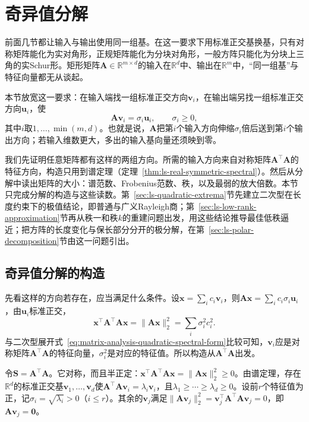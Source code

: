 
\section{奇异值分解}
\label{sec:ls-svd}

前面几节都让输入与输出使用同一组基。在这一要求下用标准正交基换基，只有对称矩阵能化为实对角形，正规矩阵能化为分块对角形，一般方阵只能化为分块上三角的实Schur形。矩形矩阵$\bm A\in\mathbb R^{m\times d}$的输入在$\mathbb R^d$中、输出在$\mathbb R^m$中，“同一组基”与特征向量都无从谈起。

本节放宽这一要求：在输入端找一组标准正交方向$\bm v_i$，在输出端另找一组标准正交方向$\bm u_i$，使
\[
 \bm A\bm v_i=\sigma_i\bm u_i,\qquad\sigma_i\geq0,
\]
其中$i$取$1,\ldots,\min(m,d)$。也就是说，$\bm A$把第$i$个输入方向伸缩$\sigma_i$倍后送到第$i$个输出方向；若输入维数更大，多出的输入基向量还须映到零。

我们先证明任意矩阵都有这样的两组方向。所需的输入方向来自对称矩阵$\bm A^\top\bm A$的特征方向，构造只用到谱定理（定理~\ref{thm:ls-real-symmetric-spectral}）。然后从分解中读出矩阵的大小：谱范数、Frobenius范数、秩，以及最弱的放大倍数。本节只完成分解的构造与这些读数。第~\ref{sec:ls-quadratic-extrema}节先建立二次型在长度约束下的极值结论，即普通与广义Rayleigh商；第~\ref{sec:ls-low-rank-approximation}节再从秩一和秩$k$的重建问题出发，用这些结论推导最佳低秩逼近；把方阵的长度变化与保长部分分开的极分解，在第~\ref{sec:ls-polar-decomposition}节由这一问题引出。

\subsection{奇异值分解的构造}
\label{sec:ls-svd-construction}

先看这样的方向若存在，应当满足什么条件。设$\bm x=\sum_ic_i\bm v_i$，则$\bm A\bm x=\sum_ic_i\sigma_i\bm u_i$，由$\bm u_i$标准正交，
\[
 \bm x^\top\bm A^\top\bm A\bm x=\lVert\bm A\bm x\rVert_2^2=\sum_i\sigma_i^2c_i^2 .
\]
与二次型展开式~\eqref{eq:matrix-analysis-quadratic-spectral-form}比较可知，$\bm v_i$应是对称矩阵$\bm A^\top\bm A$的特征向量，$\sigma_i^2$是对应的特征值。所以构造从$\bm A^\top\bm A$出发。

令$\bm S=\bm A^\top\bm A$。它对称，而且半正定：$\bm x^\top\bm A^\top\bm A\bm x=\lVert\bm A\bm x\rVert_2^2\geq0$。由谱定理，存在$\mathbb R^d$的标准正交基$\bm v_1,\ldots,\bm v_d$使$\bm A^\top\bm A\bm v_i=\lambda_i\bm v_i$，且$\lambda_1\geq\cdots\geq\lambda_d\geq0$。设前$r$个特征值为正，记$\sigma_i=\sqrt{\lambda_i}>0$（$i\leq r$）。其余的$\bm v_j$满足$\lVert\bm A\bm v_j\rVert_2^2=\bm v_j^\top\bm A^\top\bm A\bm v_j=0$，即$\bm A\bm v_j=\bm0$。

